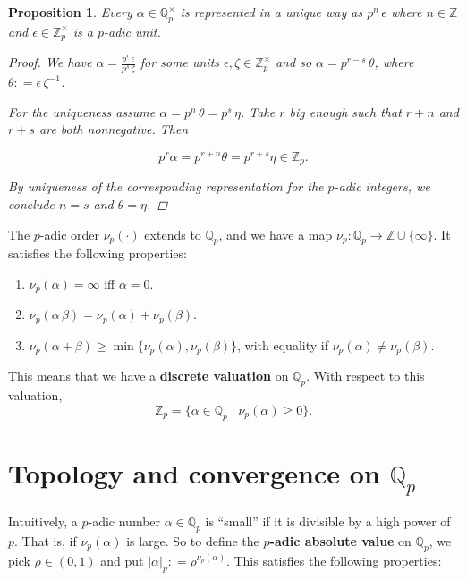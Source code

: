 \documentclass{article}
\newcommand{\term}{\textbf}
\newcommand{\dfn}{\mathrel{\mathop:}=}
\newcommand{\ZZ}{\mathbb{Z}}
\newcommand{\QQ}{\mathbb{Q}}
\theoremstyle{myplain}
\newtheorem{proposition}{Proposition}[section]
\theoremstyle{mydefinition}
\begin{document}
\begin{proposition}
  Every $\alpha \in \QQ_p^\times$ is represented in a unique way as
  $p^n\,\epsilon$ where $n \in \ZZ$ and $\epsilon \in \ZZ_p^\times$ is
  a $p$-adic unit.

  \begin{proof}
    We have $\alpha = \frac{p^r\,\epsilon}{p^s\,\zeta}$ for some units
    $\epsilon, \zeta \in \ZZ_p^\times$ and so $\alpha = p^{r-s}\,\theta$, where
    $\theta \dfn \epsilon\,\zeta^{-1}$.

    For the uniqueness assume $\alpha = p^n \, \theta = p^s \, \eta$. Take $r$
    big enough such that $r+n$ and $r+s$ are both nonnegative. Then

    \[ p^r \alpha = p^{r+n} \theta = p^{r+s} \eta \in \ZZ_p. \]

    By uniqueness of the corresponding representation for the $p$-adic integers,
    we conclude $n = s$ and $\theta = \eta$.
  \end{proof}
\end{proposition}

The $p$-adic order $ \nu_p (\cdot)$ extends to $\QQ_p$, and we have a map
$\nu_p\colon \QQ_p \to \ZZ \cup \{ \infty \}$. It satisfies the following
properties:

\begin{enumerate}
\item $\nu_p (\alpha) = \infty$ iff $\alpha = 0$.

\item $\nu_p (\alpha\,\beta) =  \nu_p (\alpha) +  \nu_p (\beta)$.

\item $\nu_p (\alpha + \beta) \ge \min \{ \nu_p (\alpha), \nu_p (\beta) \}$,
  with equality if $\nu_p (\alpha) \ne \nu_p (\beta)$.
\end{enumerate}

This means that we have a \term{discrete valuation} on $\QQ_p$. With respect to
this valuation,
\[ \ZZ_p = \{ \alpha \in \QQ_p \mid  \nu_p (\alpha) \ge 0 \}. \]

\section{Topology and convergence on $\QQ_p$}

Intuitively, a $p$-adic number $\alpha \in \QQ_p$ is ``small'' if it is
divisible by a high power of $p$. That is, if $ \nu_p (\alpha)$ is large. So to
define the \term{$p$-adic absolute value} on $\QQ_p$, we pick $\rho \in (0,1)$
and put $|\alpha|_p \dfn \rho^{ \nu_p (\alpha)}$. This satisfies the following
properties:
\end{document}
